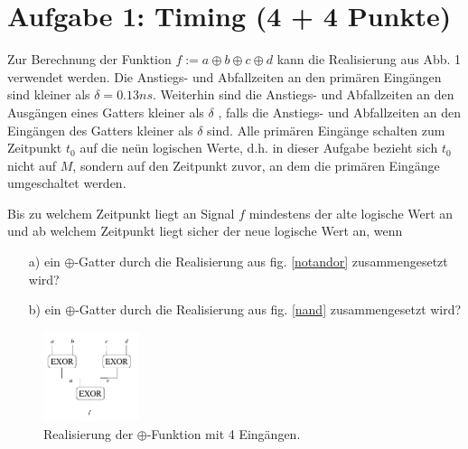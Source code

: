 \documentclass{scrartcl}[9pt, a4paper]
\begin{document}
\section*{Aufgabe 1: Timing (4 + 4 Punkte)}

Zur Berechnung der Funktion $f := a \oplus b \oplus c \oplus d$ kann die Realisierung aus Abb. 1 verwendet werden. Die Anstiegs- und Abfallzeiten an den primären Eingängen sind kleiner als $\delta = 0.13 ns$. Weiterhin sind die Anstiegs- und Abfallzeiten an den Ausgängen eines Gatters kleiner als $\delta$ , falls die Anstiegs- und Abfallzeiten an den Eingängen des Gatters kleiner als $\delta$ sind. Alle primären Eingänge schalten zum Zeitpunkt $t_0$ auf die neün logischen Werte, d.h. in dieser Aufgabe bezieht sich $t_0$ nicht auf $M$, sondern auf den Zeitpunkt zuvor, an dem die primären Eingänge umgeschaltet werden.


Bis zu welchem Zeitpunkt liegt an Signal $f$ mindestens der alte logische Wert an und ab welchem Zeitpunkt liegt sicher der neue logische Wert an, wenn

\begin{itemize}
	\item[a)] ein $\oplus$-Gatter durch die Realisierung aus fig. \ref{notandor} zusammengesetzt wird?
	\item[b)] ein $\oplus$-Gatter durch die Realisierung aus fig. \ref{nand} zusammengesetzt wird?
\end{itemize}

\begin{figure}[h]
	\centering
	\includegraphics[width=0.25\textwidth]{figs/xor1}
	\caption{Realisierung der $\oplus$-Funktion mit 4 Eingängen.}
	\label{oplus4}
\end{figure}
\end{document}
